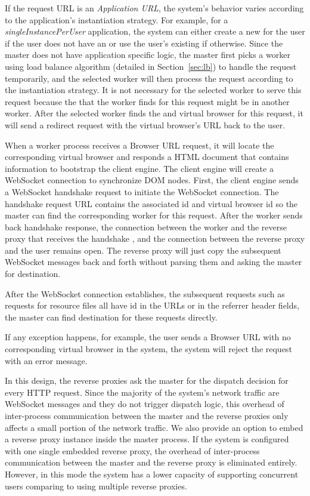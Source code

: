 If the request URL is an \emph{Application URL}, 
the system's behavior varies according to the application's instantiation strategy.
For example, for a \emph{singleInstancePerUser} application,
the system can either create a new \appins{} for the user if the user does not have an
\appins or use the user's existing \appins{} if otherwise.
Since the master does not have application specific logic,
the master first picks a worker using load
balance algorithm (detailed in Section~\ref{sec:lb}) to handle the request
temporarily, and the selected worker will then process the request according
to the instantiation strategy.
It is not necessary for the selected worker to serve this request because
the \appins{} that the worker finds for this request might be in another 
worker.
After the selected worker finds the \appins{} and virtual browser for this
request, it will send a redirect request with the virtual browser's URL
back to the user.

When a worker process receives a Browser URL request, it will locate the
corresponding virtual browser and responds a HTML document that contains
information to bootstrap the client engine. 
The client engine will create a
WebSocket connection to synchronize DOM nodes. 
First, the client engine sends
a WebSocket handshake request to initiate the
WebSocket connection.
The handshake request URL contains the associated \appins id and virtual browser
id so
the master can find the corresponding worker for this request.
After the worker sends back handshake response, the connection
between the worker and the reverse proxy that receives the handshake
, and the connection between the
reverse proxy and the user remains open. The reverse proxy will just copy
the subsequent WebSocket messages back and forth without parsing them and
asking the master for destination.

After the WebSocket connection establishes, the subsequent requests such as
requests for resource files all have \appins{} id in the URLs or in the referrer
header fields, the master can find destination for these requests directly. 

If any exception happens, for example, the user sends a Browser URL with no
corresponding virtual browser in the system, the system will reject the
request with an error message.

In this design, the reverse proxies ask the master for the dispatch decision
for every HTTP request.  Since the majority of the system's network traffic
are WebSocket messages and they do not trigger dispatch logic,  this
overhead of inter-process communication between the master and the reverse
proxies   only affects a small portion of the network traffic. 
We also provide
an option to embed a reverse proxy instance inside the master process.
If the system is configured with one single embedded reverse proxy,
the overhead of inter-process communication between the master and the reverse
proxy is eliminated entirely.
However, in this mode the system has a lower capacity of supporting concurrent users
comparing to using multiple reverse proxies.

